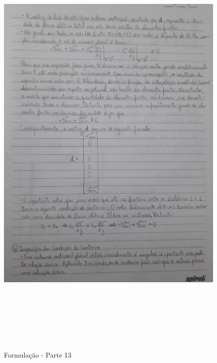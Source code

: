 \documentclass[10pt]{article}
\begin{document}
    \begin{figure}[!htb]
    \centerline{\includegraphics[width=20cm,height=22cm]{Formulação Matemática/Formulacao - Parte 13.jpg}}
    \caption{Formulação - Parte 13}
    \label{fig:fp13}
    \end{figure}
    
\end{document}
